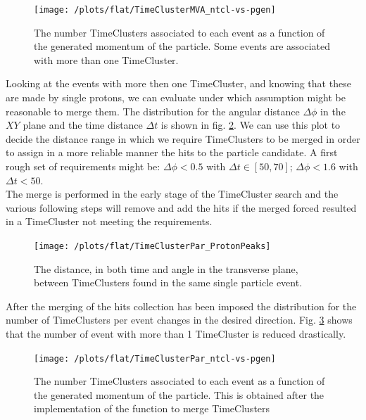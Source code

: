 \documentclass[12pt,a4paper,openright, oneside, titlepage]{book} %
\begin{document}
\begin{figure}[h!]
\centering
\texttt{[image: /plots/flat/TimeClusterMVA\_ntcl-vs-pgen]}
\caption{The number TimeClusters associated to each event as a function of the generated momentum of the particle. Some events are associated with more than one TimeCluster.}
\label{_TimeClusterMVA_ntcl-vs-pgen}
\end{figure}

\noindent Looking at the events with more then one TimeCluster, and knowing that these are made by single protons, we can evaluate under which assumption might be reasonable to merge them. 
The distribution for the angular distance $\Delta \phi$ in the $XY$ plane and the time distance $\Delta t$ is shown in fig. \ref{_TimeClusterPar_ProtonPeaks}. 
We can use this plot to decide the distance range in which we require TimeClusters to be merged in order to assign in a more reliable manner the hits to the particle candidate. 
A first rough set of requirements might be: $\Delta \phi < 0.5$ with $\Delta t \in [50,70]$; $\Delta \phi < 1.6$ with $\Delta t < 50$.\\
The merge is performed in the early stage of the TimeCluster search and the various following steps will remove and add the hits if the merged forced resulted in a TimeCluster not meeting the requirements.

\begin{figure}[h!]
\centering
\texttt{[image: /plots/flat/TimeClusterPar\_ProtonPeaks]}
\caption{The distance, in both time and angle in the transverse plane, between TimeClusters found in the same single particle event.}
\label{_TimeClusterPar_ProtonPeaks}
\end{figure}

\noindent After the merging of the hits collection has been imposed the distribution for the number of TimeClusters per event changes in the desired direction. 
Fig. \ref{_TimeClusterPar_ntcl-vs-pgen} shows that the number of event with more than 1 TimeCluster is reduced drastically.\\

\begin{figure}[h!]
\centering
\texttt{[image: /plots/flat/TimeClusterPar\_ntcl-vs-pgen]}
\caption{The number TimeClusters associated to each event as a function of the generated momentum of the particle. This is obtained after the implementation of the function to merge TimeClusters}
\label{_TimeClusterPar_ntcl-vs-pgen}
\end{figure}
\end{document}
